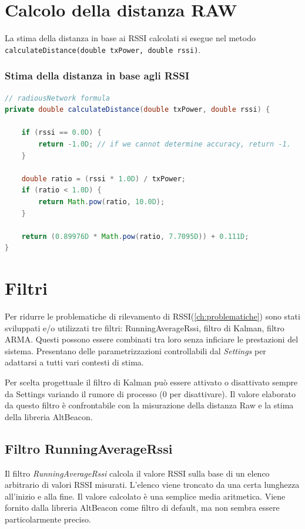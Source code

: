\section{Calcolo della distanza RAW}
La stima della distanza in base ai RSSI calcolati si esegue nel metodo \texttt{calculateDistance(double txPower, double rssi)}.

\subsubsection{Stima della distanza in base agli RSSI}
\begin{lstlisting}[language=Java]
// radiousNetwork formula
private double calculateDistance(double txPower, double rssi) {
	
	if (rssi == 0.0D) {
		return -1.0D; // if we cannot determine accuracy, return -1.
	}
	
	double ratio = (rssi * 1.0D) / txPower;
	if (ratio < 1.0D) {
		return Math.pow(ratio, 10.0D);
	}
	
	return (0.89976D * Math.pow(ratio, 7.7095D)) + 0.111D;
}
\end{lstlisting}

\section{Filtri}
Per ridurre le problematiche di rilevamento di RSSI(\ref{ch:problematiche}) sono stati sviluppati e/o utilizzati tre filtri: RunningAverageRssi, filtro di Kalman, filtro ARMA. Questi possono essere combinati tra loro senza inficiare le prestazioni del sistema. Presentano delle parametrizzazioni controllabili dal \textit{Settings} per adattarsi a tutti vari contesti di stima.

Per scelta progettuale il filtro di Kalman può essere attivato o disattivato sempre da Settings variando il rumore di processo (0 per disattivare). Il valore elaborato da questo filtro è confrontabile con la misurazione della distanza Raw e la stima della libreria AltBeacon.

\subsection{Filtro RunningAverageRssi}
Il filtro \textit{RunningAverageRssi} calcola il valore RSSI sulla base di un elenco arbitrario di valori RSSI misurati. L'elenco viene troncato da una certa lunghezza all'inizio e alla fine. Il valore calcolato è una semplice media aritmetica. Viene fornito dalla libreria AltBeacon come filtro di default, ma non sembra essere particolarmente preciso.

